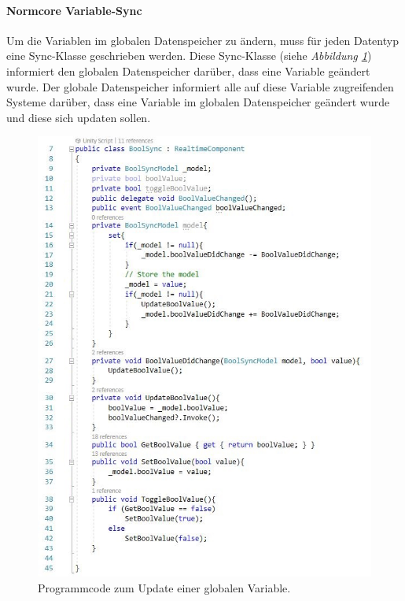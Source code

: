\documentclass[a4paper,11pt]{article}%
\renewcommand{\\}{\vspace*{0.5\baselineskip} \newline}
\begin{document}
\paragraph{Normcore Variable-Sync}
Um die Variablen im globalen Datenspeicher zu ändern, muss für jeden Datentyp eine Sync-Klasse geschrieben werden. Diese Sync-Klasse (siehe \textit{Abbildung \ref{boolSync}}) informiert den globalen Datenspeicher darüber, dass eine Variable geändert wurde. Der globale Datenspeicher informiert alle auf diese Variable zugreifenden Systeme darüber, dass eine Variable im globalen Datenspeicher geändert wurde und diese sich updaten sollen.

\begin{figure}[H]
		\begin{footnotesize}
			\includegraphics[scale=.75]{Abbildungen/boolValueChanged.jpg}
			\caption[Update von globalen Variablen]{Programmcode zum Update einer globalen Variable.}
			\label{boolSync}
		\end{footnotesize}
	\end{figure}
\end{document}

